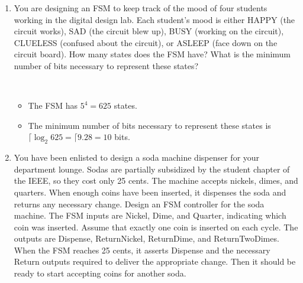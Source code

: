 \documentclass{zc-ust-hw}
\begin{document}
\begin{enumerate}
  \item You are designing an FSM to keep track of the mood of four students
    working in the digital design lab. Each student’s mood is either HAPPY (the
    circuit works), SAD (the circuit blew up), BUSY (working on the circuit),
    CLUELESS (confused about the circuit), or ASLEEP (face down on the circuit
    board). How many states does the FSM have? What is the minimum number of
    bits necessary to represent these states? 
    \begin{sol}\,
      \begin{itemize}
        \item The FSM has \( 5^4=625 \) states.
        \item The minimum number of bits necessary to represent these states is \( \lceil \log_{2} 625 = \lceil 9.28 = 10 \) bits.
      \end{itemize}
    \end{sol}

  \item You have been enlisted to design a soda machine dispenser for your
    department lounge. Sodas are partially subsidized by the student chapter of
    the IEEE, so they cost only 25 cents. The machine accepts nickels, dimes,
    and quarters. When enough coins have been inserted, it dispenses the soda
    and returns any necessary change. Design an FSM controller for the soda
    machine. The FSM inputs are Nickel, Dime, and Quarter, indicating which
    coin was inserted. Assume that exactly one coin is inserted on each cycle.
    The outputs are Dispense, ReturnNickel, ReturnDime, and ReturnTwoDimes.
    When the FSM reaches 25 cents, it asserts Dispense and the necessary Return
    outputs required to deliver the appropriate change. Then it should be ready
    to start accepting coins for another soda. 

    \begin{sol}\end{sol}
    

\end{enumerate}
\end{document}

